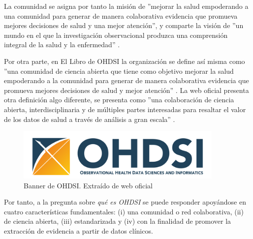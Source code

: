 La comunidad se asigna por tanto la misión de ''mejorar la salud empoderando a una comunidad para generar de manera colaborativa evidencia que promueva mejores decisiones de salud y una mejor atención'', y comparte la visión de ''un mundo en el que la investigación observacional produzca una comprensión integral de la salud y la enfermedad'' \cite{OHDSIwebsite}\cite{OHDSIbook}. 

Por otra parte, en El Libro de OHDSI la organización se define así misma como ''una comunidad de ciencia abierta que tiene como objetivo mejorar la salud empoderando a la comunidad para generar de manera colaborativa evidencia que promueva mejores decisiones de salud y mejor atención'' \cite{OHDSIbook}. La web oficial presenta otra definición algo diferente, se presenta como ''una colaboración de ciencia abierta, interdisciplinaria y de múltiples partes interesadas para resaltar el valor de los datos de salud a través de análisis a gran escala'' \cite{OHDSIwebsite}.

\begin{figure}[H]
    \centering
    \includegraphics[width=0.90\textwidth]{figures/OHDSIbanner.png}
    \caption{Banner de OHDSI. Extraído de web oficial \cite{OHDSIwebsite}}
    \label{fig:OHDSIbanner}
\end{figure}

Por tanto, a la pregunta sobre \textit{qué es OHDSI} se puede responder apoyándose en cuatro características fundamentales: (i)  una comunidad o red colaborativa, (ii) de ciencia abierta, (iii) estandarizada y (iv) con la finalidad de promover la extracción de evidencia a partir de datos clínicos.

